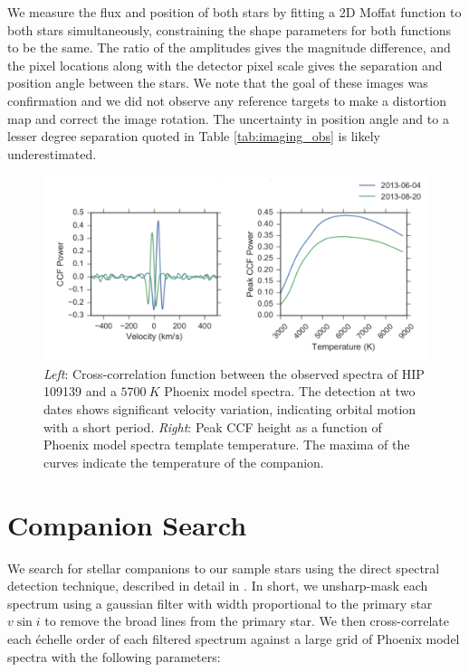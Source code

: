 \documentclass{emulateapj}
\begin{document}
We measure the flux and position of both stars by fitting a 2D Moffat function \citep{Moffat1969} to both stars simultaneously, constraining the shape parameters for both functions to be the same. The ratio of the amplitudes gives the magnitude difference, and the pixel locations along with the detector pixel scale gives the separation and position angle between the stars. We note that the goal of these images was confirmation and we did not observe any reference targets to make a distortion map and correct the image rotation. The uncertainty in position angle and to a lesser degree separation quoted in Table \ref{tab:imaging_obs} is likely underestimated.


\begin{figure}
\includegraphics[width=\textwidth]{HIP_109139.pdf}
\caption{\emph{Left}: Cross-correlation function between the observed spectra of HIP 109139 and a $5700\ K$ Phoenix model spectra. The detection at two dates shows significant velocity variation, indicating orbital motion with a short period. \emph{Right}: Peak CCF height as a function of Phoenix model spectra template temperature. The maxima of the curves indicate the temperature of the companion.}
\label{fig:ccf}
\end{figure}



\section{Companion Search}
\label{sec:companions}

We search for stellar companions to our sample stars using the direct spectral detection technique, described in detail in \citet{Gullikson2016}. In short, we unsharp-mask each spectrum using a gaussian filter with width proportional to the primary star $v\sin{i}$ to remove the broad lines from the primary star. We then cross-correlate each \'echelle order of each filtered spectrum against a large grid of Phoenix model spectra \citep{Husser2013_b} with the following parameters:
\end{document}
